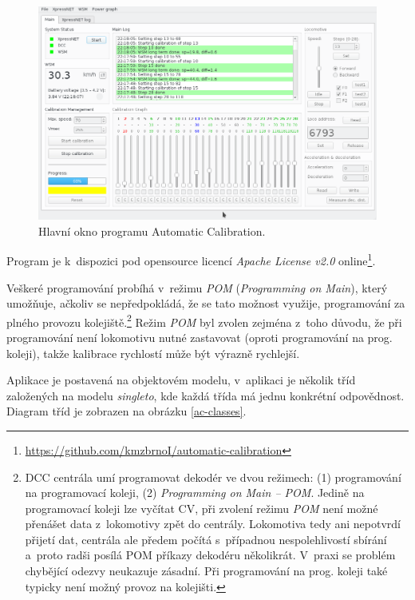 \begin{figure}[h]
\includegraphics[width=\textwidth]{data/ac_progress.png}
\caption{Hlavní okno programu Automatic Calibration.}
\label{fig:ac-gui}
\end{figure}

Program je k~dispozici pod opensource licencí \textit{Apache License v2.0}
online\footnote{\url{https://github.com/kmzbrnoI/automatic-calibration}}.

Veškeré programování probíhá v~režimu \textit{POM} (\textit{Programming on
Main}), který umožňuje, ačkoliv se nepředpokládá, že se tato možnost využije,
programování za plného provozu kolejiště.\footnote{DCC centrála umí programovat
dekodér ve dvou režimech: (1) programování na programovací koleji, (2)
\textit{Programming on Main -- POM}. Jedině na programovací koleji lze vyčítat
CV, při zvolení režimu \textit{POM} není možné přenášet data z~lokomotivy zpět
do centrály.  Lokomotiva tedy ani nepotvrdí přijetí dat, centrála ale předem
počítá s~případnou nespolehlivostí sbírání a~proto radši posílá POM příkazy
dekodéru několikrát.  V~praxi se problém chybějící odezvy neukazuje zásadní.
Při programování na prog.  koleji také typicky není možný provoz na kolejišti.}
Režim \textit{POM} byl zvolen zejména z~toho důvodu, že při programování není
lokomotivu nutné zastavovat (oproti programování na prog. koleji), takže
kalibrace rychlostí může být výrazně rychlejší.

Aplikace je postavená na objektovém modelu, v~aplikaci je několik tříd
založených na modelu \textit{singleto}, kde každá třída má jednu konkrétní
odpovědnost. Diagram tříd je zobrazen na obrázku
\ref{ac-classes}.

